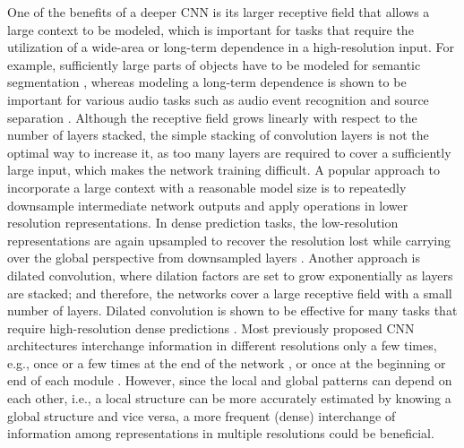 \documentclass[final]{cvpr}
\begin{document}
One of the benefits of a deeper CNN is its larger receptive field that allows a large context to be modeled, which is important for tasks that require the utilization of a wide-area or long-term dependence in a high-resolution input. For example, sufficiently large parts of objects have to be modeled for semantic segmentation \cite{Chen2015,Yu16dilation,Chen17Deeplab,zhao2017pspnet,zhao2018psanet,Seif18,WangSCJDZLMTWLX19,fu2018dual,Yuan20OCR, Zhong20SAN}, whereas modeling a long-term dependence is shown to be important for various audio tasks such as audio event recognition and source separation \cite{Takahashi2016, Takahashi2017AENet, Takahashi18MMDenseLSTM}. Although the receptive field grows linearly with respect to the number of layers stacked, the simple stacking of convolution layers is not the optimal way to increase it, as too many layers are required to cover a sufficiently large input, which makes the network training difficult.
A popular approach to incorporate a large context with a reasonable model size is to repeatedly downsample intermediate network outputs and apply operations in lower resolution representations. 
In dense prediction tasks, the low-resolution representations are again upsampled to recover the resolution lost while carrying over the global perspective from downsampled layers \cite{Noh15, Ronneberger15UNet,Long15, WangSCJDZLMTWLX19,Takahashi18MMDenseLSTM}. 
Another approach is dilated convolution, where dilation factors are set to grow exponentially as layers are stacked; and therefore, the networks cover a large receptive field with a small number of layers. Dilated convolution is shown to be effective for many tasks that require high-resolution dense predictions \cite{Yu16dilation,Chen2017DeepLab,Aaron2016WN}. 
Most previously proposed CNN architectures interchange information in different resolutions only a few times, e.g., once or a few times at the end of the network \cite{Long15,zhao2017pspnet,zhao2018psanet}, or once at the beginning or end of each module \cite{Ronneberger15UNet,WangSCJDZLMTWLX19}. 
However, since the local and global patterns can depend on each other, i.e., a local structure can be more accurately estimated by knowing a global structure and vice versa, a more frequent (dense) interchange of information among representations in multiple resolutions could be beneficial.
\end{document}
